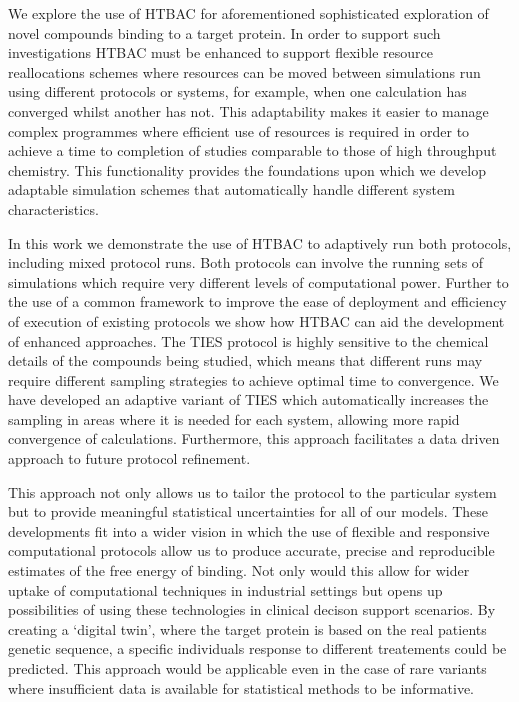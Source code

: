 We explore the use of HTBAC for aforementioned sophisticated
exploration of novel compounds binding to a target protein.
In order to support such investigations HTBAC must be enhanced to support
flexible resource reallocations schemes where resources can be moved between
simulations run using different protocols or systems, for example, when one
calculation has converged whilst another has not. This adaptability makes it
easier to manage complex programmes where efficient use of resources is
required in order to achieve a time to completion of studies comparable to
those of high throughput chemistry. This functionality provides the
foundations upon which we develop adaptable simulation schemes 
that automatically handle different system characteristics.

In this work we demonstrate the use of HTBAC to adaptively run both protocols,
including mixed protocol runs. Both protocols can involve the running sets of
simulations which require very different levels of computational power.
Further to the use of a common framework to improve the ease of deployment and
efficiency of execution of existing protocols we show how HTBAC can aid the
development of enhanced approaches. 
The TIES protocol is highly sensitive to the chemical details of the compounds being studied, which means that different runs may require different sampling strategies to achieve optimal time to convergence. 
We have developed an adaptive variant of TIES which automatically increases the sampling in areas where it is needed for each system, allowing more rapid convergence of calculations. 
Furthermore, this approach facilitates a data driven approach to future
protocol refinement.

This approach not only allows us to tailor the protocol to the particular system but to provide meaningful statistical uncertainties for all of our models.
These developments fit into a wider vision in which the use of flexible and 
responsive computational protocols allow us to produce accurate, precise and 
reproducible estimates of the free energy of binding.
Not only would this allow for wider uptake of computational techniques in industrial settings but opens up possibilities of using these technologies 
in clinical decison support scenarios.
By creating a `digital twin', where the target protein is based on the real patients genetic sequence, a specific individuals response to different treatements could be predicted.
This approach would be applicable even in the case of rare variants where insufficient data is available for statistical methods to be informative.

